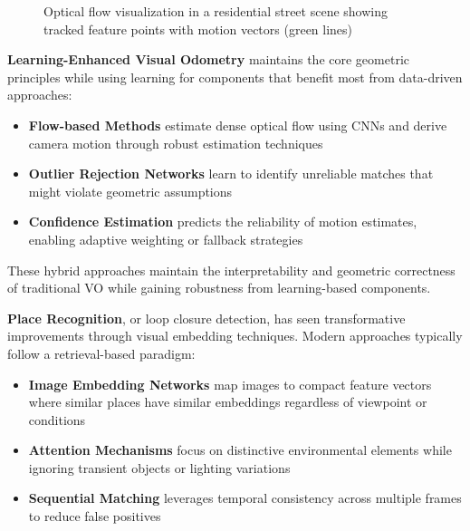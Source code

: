 \documentclass[12pt]{article}
\begin{document}
        \begin{figure}[h!]
        \vspace{0.5cm}
        \centering
        \caption{Optical flow visualization in a residential street scene showing tracked feature points with motion vectors (green lines)}
        \label{fig:vis_odometry}
    \end{figure}

    \newpage
    \textbf{Learning-Enhanced Visual Odometry} maintains the core geometric principles while using learning for components that benefit most from data-driven approaches:
    
    \begin{itemize}
        \item \textbf{Flow-based Methods} estimate dense optical flow using CNNs and derive camera motion through robust estimation techniques
        \item \textbf{Outlier Rejection Networks} learn to identify unreliable matches that might violate geometric assumptions
        \item \textbf{Confidence Estimation} predicts the reliability of motion estimates, enabling adaptive weighting or fallback strategies
    \end{itemize}
    
    These hybrid approaches maintain the interpretability and geometric correctness of traditional VO while gaining robustness from learning-based components.
    
    \textbf{Place Recognition}, or loop closure detection, has seen transformative improvements through visual embedding techniques. Modern approaches typically follow a retrieval-based paradigm:
    
    \begin{itemize}
        \item \textbf{Image Embedding Networks} map images to compact feature vectors where similar places have similar embeddings regardless of viewpoint or conditions
        \item \textbf{Attention Mechanisms} focus on distinctive environmental elements while ignoring transient objects or lighting variations
        \item \textbf{Sequential Matching} leverages temporal consistency across multiple frames to reduce false positives
    \end{itemize}
        
\end{document}
